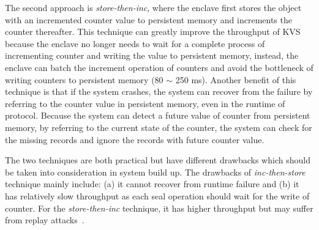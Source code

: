 The second approach is \textit{store-then-inc}, where the enclave first stores the object with 
an incremented counter value to persistent memory and increments the counter thereafter.
This technique can greatly improve the throughput of KVS because the enclave no longer needs to 
wait for a complete process of incrementing counter and writing the value to persistent memory,
instead, the enclave can batch the increment operation of counters and avoid the bottleneck 
of writing counters to persistent memory (80 $\sim$ 250 ms). Another benefit of this technique is 
that if the system crashes, the system can recover from the failure by referring to the counter 
value in persistent memory, even in the runtime of protocol. Because the system can detect a future 
value of counter from persistent memory, by referring to the current state of the counter, the 
system can check for the missing records and ignore the records with future counter value.

The two techniques are both practical but have different drawbacks which should be taken into 
consideration in system build up. The drawbacks of \textit{inc-then-store} technique mainly include: 
(a) it cannot recover from runtime failure and (b) it has relatively slow throughput as each seal operation 
should wait for the write of counter. For the \textit{store-then-inc} technique, it has higher throughput 
but may suffer from replay attacks~\cite{brenner2016securekeeper}. 
